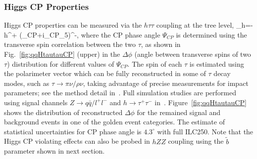 \subsubsection{Higgs CP Properties}
\label{subsubsec:higgstautauCP}
Higgs CP properties can be measured via the
$h\tau\tau$ coupling at the tree level, 
\beq
{}_{h\tau\tau}=-h{\tau^+}
(\cos\Psi_{CP}+i\sin\Psi_{CP}\gamma_5)\tau^-,
where the CP phase angle $\Psi_{CP}$ is determined using the transverse spin
correlation between the two $\tau$, as shown in Fig.~\ref{fig:qqHtautauCP} (upper)
in the $\Delta\phi$ (angle between transverse spins of two $\tau$)
distribution for different values of $\Psi_{CP}$. 
The spin of each $\tau$ is estimated using
the polarimeter vector which can be fully reconstructed in some of $\tau$ decay modes,
such as $\tau\to\pi\nu/\rho\nu$,
taking advantage of precise measurements for impact parameters; see the method detail
in~\cite{Jeans:2015vaa}. Full simulation studies are performed using signal channels 
$Z\to q\bar{q}/l^+l^-$ and $h\to \tau^+\tau^-$ in~\cite{Jeans:2018anq}. 
Figure~\ref{fig:qqHtautauCP} shows the distribution of reconstructed $\Delta\phi$
for the remained signal and background events in one of the golden event categories. 
The estimate of statistical uncertainties for CP phase angle is $4.3^\circ$ with full ILC250.
Note that the Higgs CP violating effects can also be probed in $hZZ$ coupling using the
$\tilde{b}$ parameter shown in next section.

